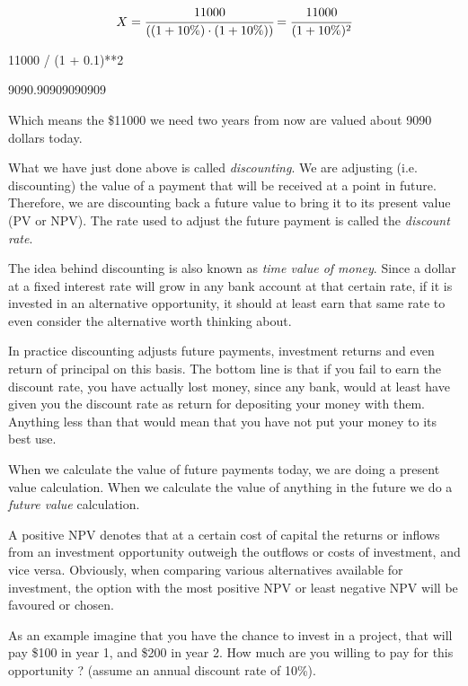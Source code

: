 \begin{equation*}
	X = \cfrac{11000}{\left((1 + 10\%) \cdot (1 + 10\%)\right)} =  \cfrac{11000}{(1+10\%)^ 2}
\end{equation*}

\begin{ipython}
11000 / (1 + 0.1)**2
\end{ipython}
\begin{ioutput}
9090.90909090909
\end{ioutput}

Which means the \$11000 we need two years from now are valued about 9090 dollars today.

What we have just done above is called \emph{discounting}. We are adjusting (i.e. discounting) the value of a payment that will be received at a point in future. Therefore, we are discounting back a future value to bring it to its present value (PV or NPV). The rate used to adjust the future payment is called the \emph{discount rate}.

The idea behind discounting is also known as \emph{time value of money}. Since a dollar at a fixed interest rate will grow in any bank account at that certain rate, if it is invested in an alternative opportunity, it should at least earn that same rate  to even consider the alternative worth thinking about. 

In practice discounting adjusts future payments, investment returns and even return of principal on this basis. The bottom line is that if you fail to earn the discount rate, you have actually lost money, since any bank, would at least have given you the discount rate as return for depositing your money with them. Anything less than that would mean that you have not put your money to its best use.

When we calculate the value of future payments today, we are doing a present value calculation. When we calculate the value of anything in the future we do a \emph{future value} calculation.

A positive NPV denotes that at a certain cost of capital the returns or inflows from an investment opportunity outweigh the outflows or costs of investment, and vice versa. Obviously, when comparing various alternatives available for investment, the option with the most positive NPV or least negative NPV will be favoured or chosen. 

As an example imagine that you have the chance to invest in a project, that will pay \$100 in year 1, and \$200 in year 2. How much are you willing to pay for this opportunity ? (assume an annual discount rate of 10\%).

